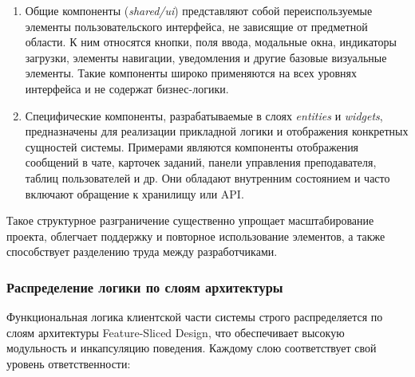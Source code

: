 \begin{enumerate}
  \item Общие компоненты (\textit{shared/ui}) представляют собой переиспользуемые элементы пользовательского интерфейса, не зависящие от предметной области. К ним относятся кнопки, поля ввода, модальные окна, индикаторы загрузки, элементы навигации, уведомления и другие базовые визуальные элементы. Такие компоненты широко применяются на всех уровнях интерфейса и не содержат бизнес-логики.
  \item Специфические компоненты, разрабатываемые в слоях \textit{entities} и \textit{widgets}, предназначены для реализации прикладной логики и отображения конкретных сущностей системы. Примерами являются компоненты отображения сообщений в чате, карточек заданий, панели управления преподавателя, таблиц пользователей и др. Они обладают внутренним состоянием и часто включают обращение к хранилищу или API.
\end{enumerate}

Такое структурное разграничение существенно упрощает масштабирование проекта, облегчает поддержку и повторное использование элементов, а также способствует разделению труда между разработчиками.

\subsubsection{Распределение логики по слоям архитектуры}

Функциональная логика клиентской части системы строго распределяется по слоям архитектуры Feature-Sliced Design, что обеспечивает высокую модульность и инкапсуляцию поведения. Каждому слою соответствует свой уровень ответственности:

